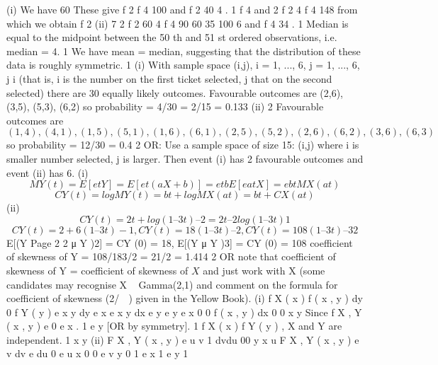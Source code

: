 \documentclass[a4paper,12pt]{article}
\begin{document}
(i)
We have 60
These give f 2
f 4 100 and
f 2
40
4 .
1
f 4 and 2 f 2 4 f 4 148
from which we obtain f 2
(ii)
7 2 f 2 60 4 f 4 90 60 35
100
6 and f 4
34 .
1
Median is equal to the midpoint between the 50 th and 51 st ordered observations, i.e. median = 4. 1
We have mean = median, suggesting that the distribution of these data is roughly symmetric. 1
(i)
With sample space {(i,j), i = 1, ..., 6, j = 1, ..., 6, j
i}
(that is, i is the number on the first ticket selected, j that on the second
selected) there are 30 equally likely outcomes.
Favourable outcomes are (2,6), (3,5), (5,3), (6,2)
so probability = 4/30 = 2/15 = 0.133
(ii)
2
Favourable outcomes are
\[(1,4), (4,1), (1,5), (5,1), (1,6), (6,1), (2,5), (5,2), (2,6), (6,2), (3,6), (6,3)\]
so probability = 12/30 = 0.4
2
OR: Use a sample space of size 15: {(i,j)} where i is smaller number selected,
j is larger.
Then event (i) has 2 favourable outcomes and event (ii) has 6.
(i)
\[MY (t) = E[etY ] = E[et(aX+b)] = etbE[eatX ] = ebtMX (at)\]
\[CY (t) = log MY (t) = bt + log MX (at) = bt + CX (at)\]
(ii)
\[CY (t) = 2t + log(1 – 3t) –2 = 2t – 2log(1 – 3t) 1\]
\[CY (t) = 2 + 6(1 – 3t)-1 , CY (t) = 18(1 – 3t) –2 , CY (t) = 108(1 – 3t) –3 2\]
E[(Y
Page 2
2
μ Y )2] = CY (0) = 18, E[(Y
μ Y )3] = CY (0) = 108
coefficient of skewness of Y = 108/183/2 = 21/2 = 1.414
2
OR note that coefficient of skewness of Y = coefficient of skewness of $X$ and just work with X (some candidates may recognise X ~ Gamma(2,1) and
comment on the formula for coefficient of skewness (2/  ) given in the
Yellow Book).
(i)
f X ( x )
f ( x , y ) dy
0
f Y ( y )
e x y
dy e x
e x y
dx e y
e y
e x
0
0
f ( x , y ) dx
0
0
x y
Since f X , Y ( x , y ) e
0
e x . 1
e y [OR by symmetry]. 1
f X ( x ) f Y ( y ) , X and Y are independent.
1
x y
(ii)
F X , Y ( x , y )
e
u v
1
dvdu
00
y
x
u
F X , Y ( x , y )
e v dv
e du
0
e
u x
0
0
e
v y
0
1 e
x
1 e
y
1
\end{document}
